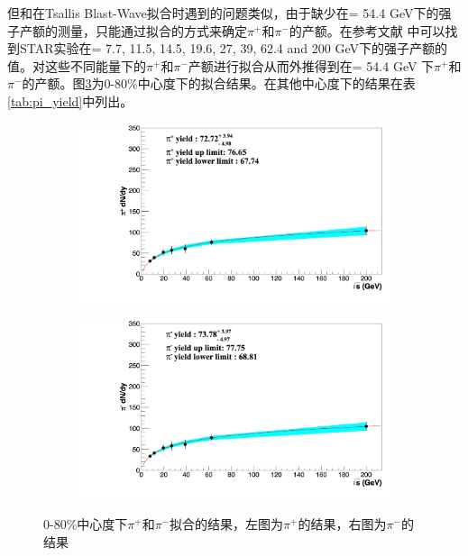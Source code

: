 但和在Tsallis Blast-Wave拟合时遇到的问题类似，由于缺少在\sNN = 54.4 GeV下的强子产额的测量，只能通过拟合的方式来确定$\pi^+$和$\pi^-$的产额。在参考文献\cite{STAR:2017sal}%
中可以找到STAR实验在\sNN = 7.7, 11.5, 14.5, 19.6, 27, 39, 62.4 and 200 GeV下的强子产额的值。对这些不同能量下的$\pi^+$和$\pi^-$产额进行拟合从而外推得到在\sNN = 54.4 GeV 下$\pi^+$和$\pi^-$的产额。图\ref{fig:pi_yield}为0-80\%中心度下的拟合结果。在其他中心度下的结果在表\ref{tab:pi_yield}中列出。
\begin{figure}[htb]
    \centering
    \begin{subfigure}[b]{0.45\textwidth}
        \centering
        \includegraphics[width=\textwidth,clip]{figures/Chapter4/080_Plus_Yield.png}
        \caption{}
        \label{fig:pi_plus_yield}
    \end{subfigure}
    \hfill
    \begin{subfigure}[b]{0.45\textwidth}
        \centering
        \includegraphics[width=\textwidth,clip]{figures/Chapter4/080_Minus_Yield.png}
        \caption{}
        \label{fig:pi_minus_yield}
    \end{subfigure}
    \caption[0-80\%中心度下$\pi^+$和$\pi^-$拟合的结果]{0-80\%中心度下$\pi^+$和$\pi^-$拟合的结果，左图为$\pi^+$的结果，右图为$\pi^-$的结果}
    \label{fig:pi_yield}
\end{figure}
